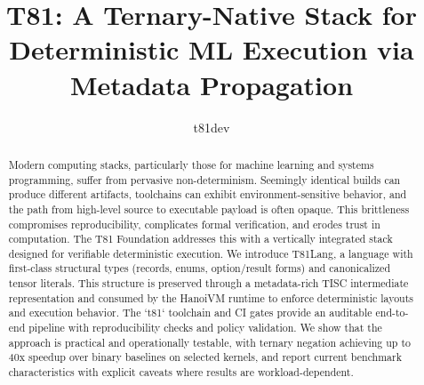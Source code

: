 \documentclass[sigconf, 10pt]{acmart}
\title{T81: A Ternary-Native Stack for Deterministic ML Execution via Metadata Propagation}
\author{t81dev}
\affiliation{%
\institution{The T81 Foundation}
\city{}
\state{}
\country{}
}
\begin{document}
\begin{abstract}
Modern computing stacks, particularly those for machine learning and systems programming, suffer from pervasive non-determinism. Seemingly identical builds can produce different artifacts, toolchains can exhibit environment-sensitive behavior, and the path from high-level source to executable payload is often opaque. This brittleness compromises reproducibility, complicates formal verification, and erodes trust in computation. The T81 Foundation addresses this with a vertically integrated stack designed for verifiable deterministic execution. We introduce T81Lang, a language with first-class structural types (records, enums, option/result forms) and canonicalized tensor literals. This structure is preserved through a metadata-rich TISC intermediate representation and consumed by the HanoiVM runtime to enforce deterministic layouts and execution behavior. The `t81` toolchain and CI gates provide an auditable end-to-end pipeline with reproducibility checks and policy validation. We show that the approach is practical and operationally testable, with ternary negation achieving up to 40x speedup over binary baselines on selected kernels, and report current benchmark characteristics with explicit caveats where results are workload-dependent.
\end{abstract}
\maketitle
\end{document}
